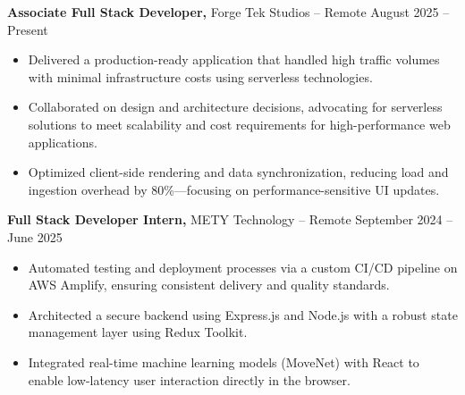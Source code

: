 \documentclass[11pt]{article}       %
\begin{document}
\textbf{Associate Full Stack Developer,} {Forge Tek Studios} -- Remote \hfill August 2025 -- Present \\
\vspace{-9pt}
\begin{itemize}
  \item Delivered a production-ready application that handled high traffic volumes with minimal infrastructure costs using serverless technologies.
  \item Collaborated on design and architecture decisions, advocating for serverless solutions to meet scalability and cost requirements for high-performance web applications.
  \item Optimized client-side rendering and data synchronization, reducing load and ingestion overhead by 80\%—focusing on performance-sensitive UI updates.
\end{itemize}

\textbf{Full Stack Developer Intern,} {METY Technology} -- Remote \hfill September 2024 -- June 2025 \\
\vspace{-9pt}
\begin{itemize}
  \item Automated testing and deployment processes via a custom CI/CD pipeline on AWS Amplify, ensuring consistent delivery and quality standards.
  \item Architected a secure backend using Express.js and Node.js with a robust state management layer using Redux Toolkit.
  \item Integrated real-time machine learning models (MoveNet) with React to enable low-latency user interaction directly in the browser.
\end{itemize}

\end{document}
